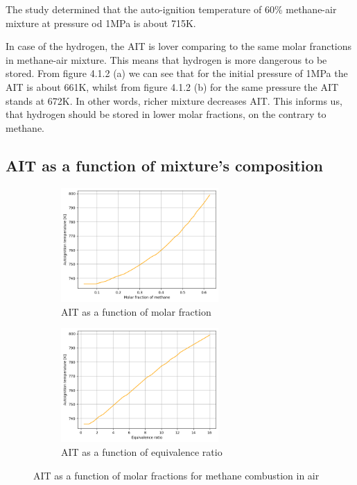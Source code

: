 \documentclass[a4paper,11pt]{article}
\begin{document}
The study determined that the auto-ignition temperature of 60\% methane-air mixture at pressure od 1MPa is about 715K.\par
	In case of the hydrogen, the AIT is lover comparing to the same molar franctions in methane-air mixture. This means that hydrogen is more dangerous to be stored. From figure 4.1.2 (a) we can see that for the initial pressure of 1MPa the AIT is about 661K, whilst from figure 4.1.2 (b) for the same pressure the AIT stands at 672K. In other words, richer mixture decreases AIT. This informs us, that hydrogen should be stored in lower molar fractions, on the contrary to methane.\par
\newpage
\subsection{AIT as a function of mixture's composition}

\begin{figure}[h]
\begin{subfigure}{.5\textwidth}
\centering
\includegraphics[width=6cm]{2metan.png}
\caption{AIT as a function of molar fraction}
\end{subfigure}
\begin{subfigure}{.5\textwidth}
\centering
\includegraphics[width=6cm]{3metan.png}
\caption{AIT as a function of equivalence ratio}
\end{subfigure}
\caption{AIT as a function of molar fractions for methane combustion in air}
\end{figure}
\end{document}
